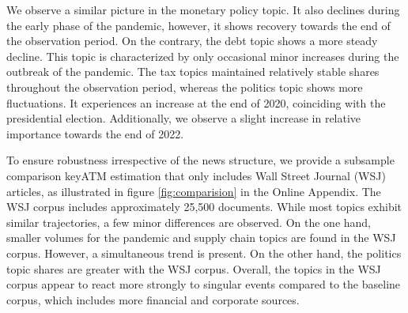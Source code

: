 We observe a similar picture in the monetary policy topic. It also declines during the early phase of the pandemic, however, it shows recovery towards the end of the observation period. On the contrary, the debt topic shows a more steady decline. This topic is characterized by only occasional minor increases during the outbreak of the pandemic. The tax topics maintained relatively stable shares throughout the observation period, whereas the politics topic shows more fluctuations. It experiences an increase at the end of 2020, coinciding with the presidential election. Additionally, we observe a slight increase in relative importance towards the end of 2022.

To ensure robustness irrespective of the news structure, we provide a subsample comparison \textsf{keyATM} estimation that only includes Wall Street Journal (WSJ) articles, as illustrated in figure \ref{fig:comparision} in the Online Appendix. The WSJ corpus includes approximately 25,500 documents. While most topics exhibit similar trajectories, a few minor differences are observed. On the one hand, smaller volumes for the pandemic and supply chain topics are found in the WSJ corpus. However, a simultaneous trend is present. On the other hand, the politics topic shares are greater with the WSJ corpus. Overall, the topics in the WSJ corpus appear to react more strongly to singular events compared to the baseline corpus, which includes more financial and corporate sources.


